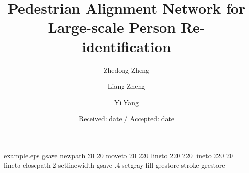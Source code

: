 \begin{filecontents*}{example.eps}
gsave
newpath
  20 20 moveto
  20 220 lineto
  220 220 lineto
  220 20 lineto
closepath
2 setlinewidth
gsave
  .4 setgray fill
grestore
stroke
grestore
\end{filecontents*}
\RequirePackage{fix-cm}
\documentclass[twocolumn]{svjour3}          \smartqed  \usepackage{graphicx}
\usepackage{multirow}
\usepackage{hyperref}
\usepackage{amsmath}
\usepackage{cite}
\usepackage{floatrow}



\title{Pedestrian Alignment Network for \\Large-scale Person Re-identification
}




\author{Zhedong Zheng \and 
	    Liang Zheng \and 
		Yi Yang 
}




\date{Received: date / Accepted: date}



\maketitle

\begin{abstract}
Person re-identification (person re-ID) is mostly viewed as an image retrieval problem. This task aims to search a query person in a large image pool. In practice, person re-ID usually adopts automatic detectors to obtain cropped pedestrian images. However, this process suffers from two types of detector errors: excessive background and part missing. Both errors deteriorate the quality of pedestrian alignment and may compromise pedestrian matching due to the position and scale variances.
To address the misalignment problem, we propose that alignment can be learned from an identification procedure. We introduce the pedestrian alignment network (PAN) which allows discriminative embedding learning and pedestrian alignment without extra annotations.  Our key observation is that when the convolutional neural network (CNN) learns to discriminate between different identities, the learned feature maps usually exhibit strong activations on the human body rather than the background. 
The proposed network thus takes advantage of this attention mechanism to adaptively locate and align pedestrians within a bounding box.
Visual examples show that pedestrians are better aligned with PAN.
Experiments on three large-scale re-ID datasets confirm that PAN improves the discriminative ability of the feature embeddings and yields competitive accuracy with the state-of-the-art methods. \footnote{ The project website of this paper is \url{https://github.com/layumi/Pedestrian_Alignment}.}

\end{abstract}

